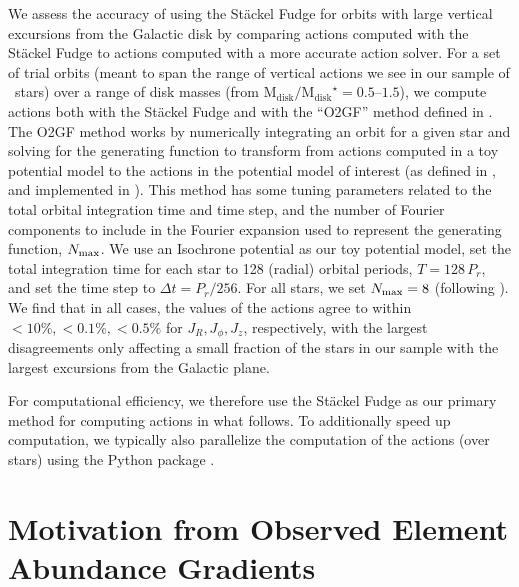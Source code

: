 \documentclass[modern]{aastex63}
\newcommand{\apogee}{\acronym{APOGEE}}
\newcommand{\mdisk}{\ensuremath{\mathrm{M}_\mathrm{disk}}}
\newcommand{\mratio}{\ensuremath{\mdisk / \mdisk^\star}}
\begin{document}
We assess the accuracy of using the St\"ackel Fudge for orbits with large
vertical excursions from the Galactic disk by comparing actions computed with
the St\"ackel Fudge to actions computed with a more accurate action solver.
For a set of trial orbits (meant to span the range of vertical actions we see in
our sample of \apogee\ stars) over a range of disk masses (from
$\mratio=0.5$--$1.5$), we compute actions both with the St\"ackel Fudge and with
the ``O2GF'' method defined in \citet{Sanders:2014, Sanders:2016}.
The O2GF method works by numerically integrating an orbit for a given star and
solving for the generating function to transform from actions computed in a toy
potential model to the actions in the potential model of interest (as defined in
\citealt{Sanders:2014}, and implemented in ).
This method has some tuning parameters related to the total orbital integration
time and time step, and the number of Fourier components to include in the
Fourier expansion used to represent the generating function, $N_{\rm max}$.
We use an Isochrone potential as our toy potential model, set the total
integration time for each star to 128 (radial) orbital periods, $T=128\,P_r$,
and set the time step to $\Delta t = P_r / 256$. For all stars, we set $N_{\rm
max} = 8$ (following \citealt{Sanders:2016}).
We find that in all cases, the values of the actions agree to within $<10\%,
<0.1\%, <0.5\%$ for $J_R, J_\phi, J_z$, respectively, with the largest
disagreements only affecting a small fraction of the stars in our sample with
the largest excursions from the Galactic plane.

For computational efficiency, we therefore use the St\"ackel Fudge as our
primary method for computing actions in what follows.
To additionally speed up computation, we typically also parallelize the
computation of the actions (over stars) using the Python package
 \citep{schwimmbad}.


\section{Motivation from Observed Element Abundance Gradients}
\label{sec:motivation}
\end{document}
